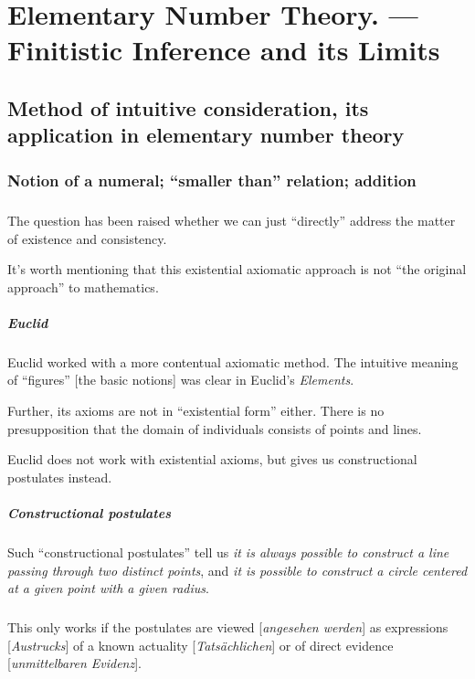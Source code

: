 \chapter[Elementary Number Theory]{Elementary Number Theory. --- Finitistic Inference and its Limits}

\section{Method of intuitive consideration, its application in elementary number theory}

\subsection{Notion of a numeral; ``smaller than'' relation; addition}

\paragraph{} %
The question has been raised whether we can just ``directly'' address
the matter of existence and consistency.

It's worth mentioning that this existential axiomatic approach is not
``the original approach'' to mathematics.

\paragraph{Euclid} %
Euclid worked with a more contentual axiomatic method. The intuitive
meaning of ``figures'' [the basic notions] was clear in Euclid's
\emph{Elements}.

Further, its axioms are not in ``existential form'' either. There is
no presupposition that the domain of individuals consists of points
and lines.

Euclid does not work with existential axioms, but gives us
constructional postulates instead.

\paragraph{Constructional postulates} %
Such ``constructional postulates'' tell us \emph{it is always possible
to construct a line passing through two distinct points}, and \emph{it
is possible to construct a circle centered at a given point with a
given radius}.

\paragraph{} %
This only works if the postulates are viewed [\textit{angesehen werden\/}] as expressions [\textit{Austrucks\/}]
of a known actuality [\textit{Tats\"{a}chlichen\/}] or of direct
evidence [\textit{unmittelbaren Evidenz\/}].

